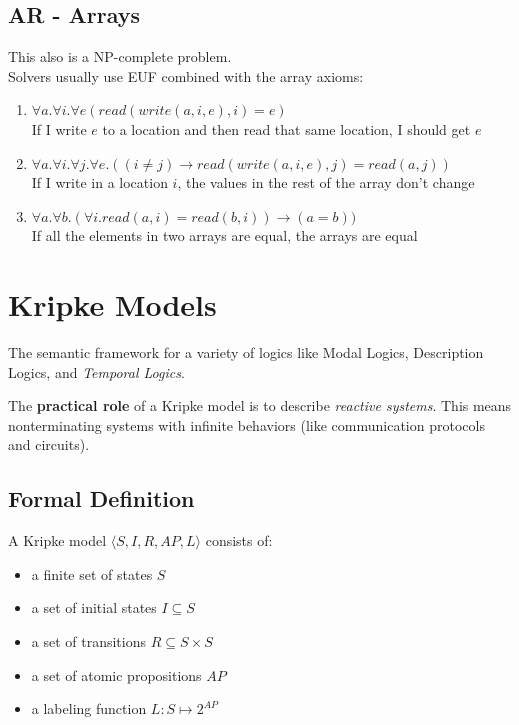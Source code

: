 \documentclass{article}
\begin{document}
\subsection*{AR - Arrays}
This also is a NP-complete problem.\\
Solvers usually use EUF combined with the array axioms:
\begin{enumerate}
    \item $\forall a.\forall i.\forall e (read(write(a,i,e), i) = e)$ \\
        If I write $e$ to a location and then read that same location, I should get $e$
    \item $\forall a. \forall i. \forall j. \forall e. ((i\neq j) \to read(write(a,i,e),j)=read(a,j))$ \\
        If I write in a location $i$, the values in the rest of the array don't change
    \item $\forall a.\forall b. (\forall i.read(a,i)=read(b,i)) \to (a=b))$ \\
        If all the elements in two arrays are equal, the arrays are equal
\end{enumerate}

\section{Kripke Models}
The semantic framework for a variety of logics like Modal Logics, Description Logics, and \textit{Temporal Logics}.

The \textbf{practical role} of a Kripke model is to describe \textit{reactive systems}. This means nonterminating systems with infinite behaviors (like communication protocols and circuits).

\subsection{Formal Definition}
A Kripke model $\langle S, I, R, AP, L\rangle$ consists of:
\begin{itemize}
    \item a finite set of states $S$
    \item a set of initial states $I \subseteq S$
    \item a set of transitions $R\subseteq S\times S$
    \item a set of atomic propositions $AP$
    \item a labeling function $L: S\mapsto 2^{AP}$
\end{itemize}
\end{document}
